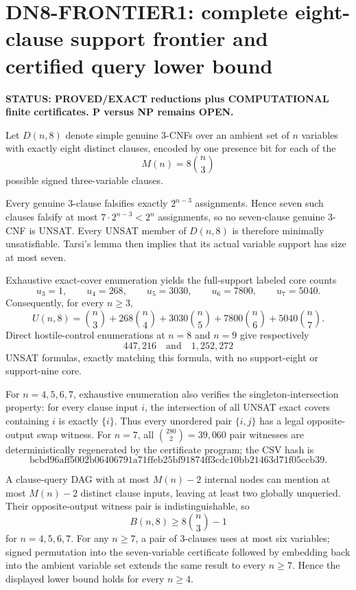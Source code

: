 \section*{DN8-FRONTIER1: complete eight-clause support frontier and certified query lower bound}

\textbf{STATUS: PROVED/EXACT reductions plus COMPUTATIONAL finite certificates. P versus NP remains OPEN.}

Let \(D(n,8)\) denote simple genuine 3-CNFs over an ambient set of \(n\) variables with exactly eight distinct clauses, encoded by one presence bit for each of the
\[
M(n)=8\binom n3
\]
possible signed three-variable clauses.

Every genuine 3-clause falsifies exactly \(2^{n-3}\) assignments. Hence seven such clauses falsify at most \(7\cdot2^{n-3}<2^n\) assignments, so no seven-clause genuine 3-CNF is UNSAT. Every UNSAT member of \(D(n,8)\) is therefore minimally unsatisfiable. Tarsi's lemma then implies that its actual variable support has size at most seven.

Exhaustive exact-cover enumeration yields the full-support labeled core counts
\[
u_3=1,\qquad u_4=268,\qquad u_5=3030,\qquad u_6=7800,\qquad u_7=5040.
\]
Consequently, for every \(n\ge3\),
\[
\boxed{
U(n,8)=
\binom n3+
268\binom n4+
3030\binom n5+
7800\binom n6+
5040\binom n7
}.
\]
Direct hostile-control enumerations at \(n=8\) and \(n=9\) give respectively
\[
447{,}216\quad\text{and}\quad1{,}252{,}272
\]
UNSAT formulas, exactly matching this formula, with no support-eight or support-nine core.

For \(n=4,5,6,7\), exhaustive enumeration also verifies the singleton-intersection property: for every clause input \(i\), the intersection of all UNSAT exact covers containing \(i\) is exactly \(\{i\}\). Thus every unordered pair \(\{i,j\}\) has a legal opposite-output swap witness. For \(n=7\), all \(\binom{280}{2}=39{,}060\) pair witnesses are deterministically regenerated by the certificate program; the CSV hash is
\[
\text{bcbd96aff5002b06406791a71ffeb25bf91874ff3cdc10bb21463d71f05ccb39}.
\]

A clause-query DAG with at most \(M(n)-2\) internal nodes can mention at most \(M(n)-2\) distinct clause inputs, leaving at least two globally unqueried. Their opposite-output witness pair is indistinguishable, so
\[
\boxed{B(n,8)\ge8\binom n3-1}
\]
for \(n=4,5,6,7\). For any \(n\ge7\), a pair of 3-clauses uses at most six variables; signed permutation into the seven-variable certificate followed by embedding back into the ambient variable set extends the same result to every \(n\ge7\). Hence the displayed lower bound holds for every \(n\ge4\).

